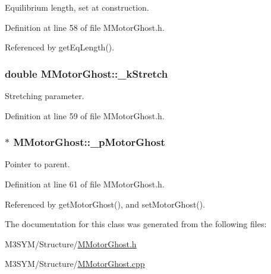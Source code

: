 Equilibrium length, set at construction. 



Definition at line 58 of file M\+Motor\+Ghost.\+h.



Referenced by get\+Eq\+Length().

\hypertarget{classMMotorGhost_ac4dd3bd5770e8e7793b1f1a8413ab9e6}{
\subsubsection[{\+\_\+k\+Stretch}]{\setlength{\rightskip}{0pt plus 5cm}double M\+Motor\+Ghost\+::\+\_\+k\+Stretch\hspace{0.3cm}{\ttfamily [private]}}}\label{classMMotorGhost_ac4dd3bd5770e8e7793b1f1a8413ab9e6}


Stretching parameter. 



Definition at line 59 of file M\+Motor\+Ghost.\+h.

\hypertarget{classMMotorGhost_a3c22024539ed93368cd83cda70e075a4}{
\subsubsection[{\+\_\+p\+Motor\+Ghost}]{$\ast$ M\+Motor\+Ghost\+::\+\_\+p\+Motor\+Ghost\hspace{0.3cm}{\ttfamily [private]}}}\label{classMMotorGhost_a3c22024539ed93368cd83cda70e075a4}


Pointer to parent. 



Definition at line 61 of file M\+Motor\+Ghost.\+h.



Referenced by get\+Motor\+Ghost(), and set\+Motor\+Ghost().



The documentation for this class was generated from the following files\+:\begin{DoxyCompactItemize}
\item 
M3\+S\+Y\+M/\+Structure/\hyperlink{MMotorGhost_8h}{M\+Motor\+Ghost.\+h}\item 
M3\+S\+Y\+M/\+Structure/\hyperlink{MMotorGhost_8cpp}{M\+Motor\+Ghost.\+cpp}\end{DoxyCompactItemize}
